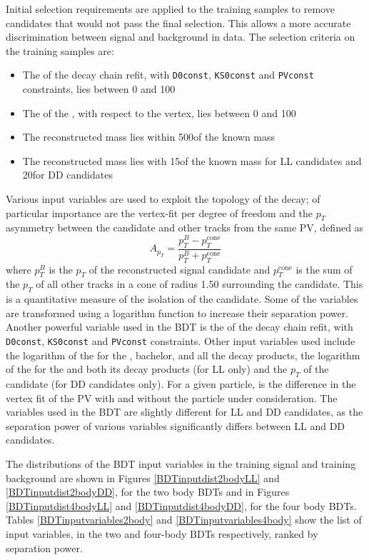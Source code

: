 Initial selection requirements are applied to the training samples to remove candidates that would not pass the final selection. This allows a more accurate discrimination between signal and background in data. The selection criteria on the training samples are:

\begin{itemize}
\item The \chisq of the decay chain refit, with {\tt D0const}, {\tt KS0const} and {\tt PVconst} constraints, lies between 0 and 100
\item The \chisqip of the \B, with respect to the \B vertex, lies between 0 and 100
\item The reconstructed \Kstarpm mass lies within 500\mev of the known \Kstar mass
\item The reconstructed \KS mass lies with 15\mev of the known \KS mass for LL candidates and 20\mev for DD candidates
\end{itemize}

Various input variables are used to exploit the topology of the decay; of particular importance are the \Bm vertex-fit \chisq per degree of freedom and the $p_T$ asymmetry between the \Bm candidate and other tracks from the same PV, defined as
\begin{equation}
A_{p_T} = \frac{p_T^B - p_T^{\text{cone}}}{p_T^B + p_T^{\text{cone}}}
\end{equation}
where $p_T^B$ is the $p_T$ of the reconstructed \Bm signal candidate and $p_T^{\text{cone}}$ is the sum of the $p_T$ of all other tracks in a cone of radius 1.50 surrounding the \Bm candidate. This is a quantitative measure of the isolation of the \Bm candidate. Some of the variables are transformed using a logarithm function to increase their separation power. Another powerful variable used in the BDT is the \chisq of the decay chain refit, with {\tt D0const}, {\tt KS0const} and {\tt PVconst} constraints. Other input variables used include the logarithm of the \chisqip for the \B, bachelor, \D and all the \D decay products, the logarithm of the \chisqip for the \KS and both its decay products (for LL only) and the $p_T$ of the \KS candidate (for DD candidates only). For a given particle, \chisqip is the difference in the vertex fit \chisq of the PV with and without the particle under consideration. The variables used in the BDT are slightly different for LL and DD candidates, as the separation power of various \KS variables significantly differs between LL and DD candidates. 

The distributions of the BDT input variables in the training signal and training background are shown in Figures \ref{BDTinputdist2bodyLL} and \ref{BDTinputdist2bodyDD}, for the two body BDTs and in Figures \ref{BDTinputdist4bodyLL} and \ref{BDTinputdist4bodyDD}, for the four body BDTs. Tables \ref{BDTinputvariables2body} and \ref{BDTinputvariables4body} show the list of input variables, in the two and four-body BDTs respectively, ranked by separation power.

